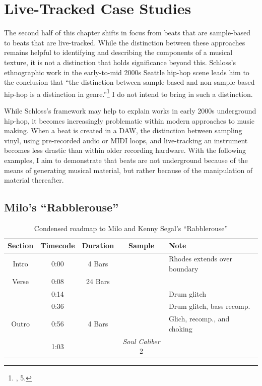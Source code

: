 \section{Live-Tracked Case Studies}
The second half of this chapter shifts in focus from beats that are sample-based to beats that are
live-tracked. While the distinction between these approaches remains helpful to identifying and describing
the components of a musical texture, it is not a distinction that holds significance beyond this. 
Schloss's ethnographic work in the early-to-mid 2000s Seattle hip-hop scene leads him to the conclusion
that ``the distinction between sample-based and non-sample-based hip-hop is a distinction in
genre.''\footnote{\cite{josephgschlossMakingBeatsArt2004}, 5.} I do not intend to bring in 
such a distinction.

While Schloss's framework may help to explain works in early 2000s underground hip-hop, it becomes
increasingly problematic within modern approaches to music making. When a beat is created in a DAW, 
the distinction between sampling vinyl, using pre-recorded audio or MIDI loops, and live-tracking an
instrument becomes less drastic than within older recording hardware. With the following examples, I aim
to demonstrate that beats are not underground because of the means of generating musical material, but 
rather because of the manipulation of material thereafter.

\subsection*{\centering Milo's ``Rabblerouse''}

\begin{table}[ht]
    \centering
        \begin{tabular}{|c|c|c|c|l|}
             \hline
            Section & Timecode & Duration & Sample                  & Note \\ \hline
            Intro   & 0:00     & 4 Bars   &                         & Rhodes extends over boundary \\ \hline
            Verse   & 0:08     & 24 Bars  &                         & \\ \hline
                    & 0:14     &          &                         & Drum glitch \\ \hline
                    & 0:36     &          &                         & Drum glitch, bass recomp. \\ \hline
            Outro   & 0:56     & 4 Bars   &                         & Glich, recomp., and choking \\ \hline
                    & 1:03     &          & \textit{Soul Caliber} 2 & \\ \hline
        \end{tabular}
    \caption{Condensed roadmap to Milo and Kenny Segal's ``Rabblerouse''}
    \label{tab:rabblerouse}
\end{table}

